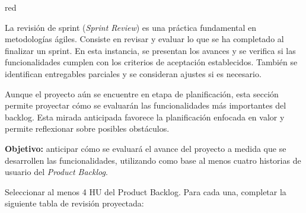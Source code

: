 \documentclass[
11pt, %
]{charter}
\begin{document}
\begin{consigna}{red} %

La revisión de sprint (\emph{Sprint Review}) es una práctica fundamental en metodologías ágiles. Consiste en revisar y evaluar lo que se ha completado al finalizar un sprint. En esta instancia, se presentan los avances y se verifica si las funcionalidades cumplen con los criterios de aceptación establecidos. También se identifican entregables parciales y se consideran ajustes si es necesario.

Aunque el proyecto aún se encuentre en etapa de planificación, esta sección permite proyectar cómo se evaluarán las funcionalidades más importantes del backlog. Esta mirada anticipada favorece la planificación enfocada en valor y permite reflexionar sobre posibles obstáculos.

\textbf{Objetivo:} anticipar cómo se evaluará el avance del proyecto a medida que se desarrollen las funcionalidades, utilizando como base al menos cuatro historias de usuario del \emph{Product Backlog}.


Seleccionar al menos 4 HU del Product Backlog. Para cada una, completar la siguiente tabla de revisión proyectada:


\end{consigna}
\end{document}
